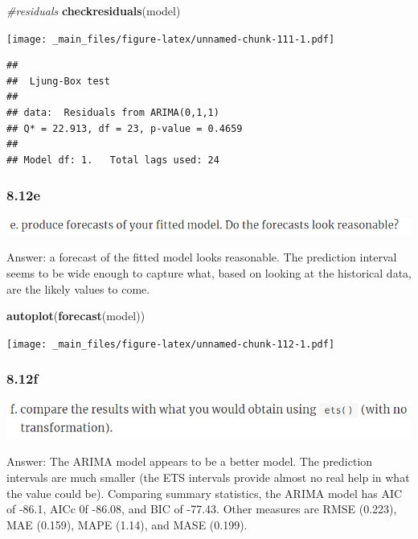\documentclass[]{book}
\newenvironment{Shaded}{\begin{snugshade}}{\end{snugshade}}
\newcommand{\CommentTok}[1]{\textcolor[rgb]{0.56,0.35,0.01}{\textit{#1}}}
\newcommand{\KeywordTok}[1]{\textcolor[rgb]{0.13,0.29,0.53}{\textbf{#1}}}
\newcommand{\NormalTok}[1]{#1}
\begin{document}
\begin{Shaded}
\begin{Highlighting}[]
\CommentTok{#residuals}
\KeywordTok{checkresiduals}\NormalTok{(model)}
\end{Highlighting}
\end{Shaded}

\texttt{[image: \_main\_files/figure-latex/unnamed-chunk-111-1.pdf]}

\begin{verbatim}
## 
##  Ljung-Box test
## 
## data:  Residuals from ARIMA(0,1,1)
## Q* = 22.913, df = 23, p-value = 0.4659
## 
## Model df: 1.   Total lags used: 24
\end{verbatim}

\hypertarget{e-5}{%
\subsubsection{8.12e}\label{e-5}}

\includegraphics{./week5/8.12e.png}

Answer: a forecast of the fitted model looks reasonable. The prediction interval seems to be wide enough to capture what, based on looking at the historical data, are the likely values to come.

\begin{Shaded}
\begin{Highlighting}[]
\KeywordTok{autoplot}\NormalTok{(}\KeywordTok{forecast}\NormalTok{(model))}
\end{Highlighting}
\end{Shaded}

\texttt{[image: \_main\_files/figure-latex/unnamed-chunk-112-1.pdf]}

\hypertarget{f-5}{%
\subsubsection{8.12f}\label{f-5}}

\includegraphics{./week5/8.12f.png}

Answer: The ARIMA model appears to be a better model. The prediction intervals are much smaller (the ETS intervals provide almost no real help in what the value could be). Comparing summary statistics, the ARIMA model has AIC of -86.1, AICc 0f -86.08, and BIC of -77.43. Other measures are RMSE (0.223), MAE (0.159), MAPE (1.14), and MASE (0.199).
\end{document}
